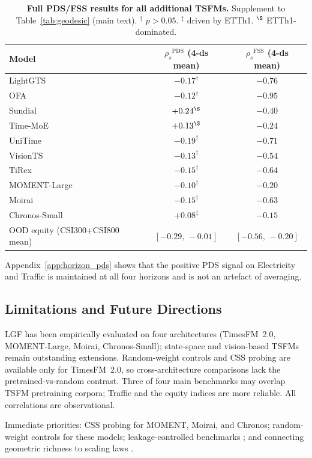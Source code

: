 \documentclass[10pt]{article}
\theoremstyle{definition}
\theoremstyle{remark}
\newcommand{\pds}{\ensuremath{\mathrm{PDS}}}
\newcommand{\fss}{\ensuremath{\mathrm{FSS}}}
\newcommand{\rspear}{\ensuremath{\rho_s}}
\begin{document}
\begin{table}[h]
\centering
\caption{\textbf{Full PDS/FSS results for all additional TSFMs.}
Supplement to Table~\ref{tab:geodesic} (main text).
$^\dagger$ $p{>}0.05$. $^\ddagger$ driven by ETTh1. $^\S$ ETTh1-dominated.}
\label{tab:geodesic_ext}
\small
\setlength{\tabcolsep}{3pt}
\begin{tabular}{lcc}
\toprule
\textbf{Model} & $\rspear^{\pds}$ (4-ds mean) & $\rspear^{\fss}$ (4-ds mean)\\
\midrule
LightGTS      & $-0.17^\dagger$ & $-0.76$\\
OFA           & $-0.12^\dagger$ & $-0.95$\\
Sundial       & $+0.24^{\S}$    & $-0.40$\\
Time-MoE      & $+0.13^{\S}$    & $-0.24$\\
UniTime       & $-0.19^\dagger$ & $-0.71$\\
VisionTS      & $-0.13^\dagger$ & $-0.54$\\
TiRex         & $-0.15^\dagger$ & $-0.64$\\
MOMENT-Large  & $-0.10^\dagger$ & $-0.20$\\
Moirai        & $-0.15^\dagger$ & $-0.63$\\
Chronos-Small & $+0.08^\ddagger$& $-0.15$\\
\midrule
OOD equity (CSI300+CSI800 mean) & $[-0.29,\,-0.01]$ & $[-0.56,\,-0.20]$\\
\bottomrule
\end{tabular}
\end{table}
Appendix~\ref{app:horizon_pds} shows that the positive PDS signal on
Electricity and Traffic is maintained at all four horizons and is not an
artefact of averaging.

\subsection{Limitations and Future Directions}
\label{app:limitations}

LGF has been empirically evaluated on four architectures (TimesFM~2.0,
MOMENT-Large, Moirai, Chronos-Small); state-space and vision-based TSFMs
remain outstanding extensions.
Random-weight controls and CSS probing are available only for TimesFM~2.0,
so cross-architecture comparisons lack the pretrained-vs-random contrast.
Three of four main benchmarks may overlap TSFM pretraining corpora; Traffic
and the equity indices are more reliable.
All correlations are observational.

Immediate priorities: CSS probing for MOMENT, Moirai, and Chronos;
random-weight controls for these models; leakage-controlled benchmarks
\citep{aksu2024gifteval,qiu2024tfb}; and connecting geometric richness to
scaling laws \citep{edwards2024scalinglaws}.
\end{document}
